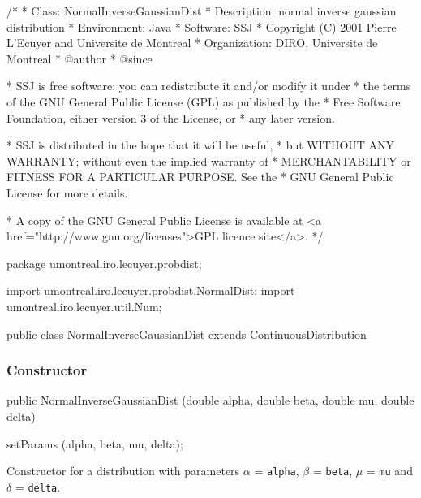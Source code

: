 \begin{code}
\begin{hide}
/*
 * Class:        NormalInverseGaussianDist
 * Description:  normal inverse gaussian distribution
 * Environment:  Java
 * Software:     SSJ 
 * Copyright (C) 2001  Pierre L'Ecuyer and Universite de Montreal
 * Organization: DIRO, Universite de Montreal
 * @author       
 * @since

 * SSJ is free software: you can redistribute it and/or modify it under
 * the terms of the GNU General Public License (GPL) as published by the
 * Free Software Foundation, either version 3 of the License, or
 * any later version.

 * SSJ is distributed in the hope that it will be useful,
 * but WITHOUT ANY WARRANTY; without even the implied warranty of
 * MERCHANTABILITY or FITNESS FOR A PARTICULAR PURPOSE.  See the
 * GNU General Public License for more details.

 * A copy of the GNU General Public License is available at
   <a href="http://www.gnu.org/licenses">GPL licence site</a>.
 */
\end{hide}
package umontreal.iro.lecuyer.probdist;
\begin{hide}
import umontreal.iro.lecuyer.probdist.NormalDist;
import umontreal.iro.lecuyer.util.Num;
\end{hide}

public class NormalInverseGaussianDist extends ContinuousDistribution\begin{hide} {
   protected double alpha;
   protected double beta;
   protected double gamma;
   protected double delta;
   protected double mu;
\end{hide}
\end{code}
\subsubsection* {Constructor}

\begin{code}

   public NormalInverseGaussianDist (double alpha, double beta, double mu,
                                     double delta)\begin{hide} {
      setParams (alpha, beta, mu, delta);
   }\end{hide}
\end{code}
\begin{tabb}
Constructor for a \nig{} distribution  with parameters $\alpha$ = \texttt{alpha},
 $\beta$ = \texttt{beta}, $\mu$ = \texttt{mu} and $\delta$ = \texttt{delta}.
\end{tabb}

